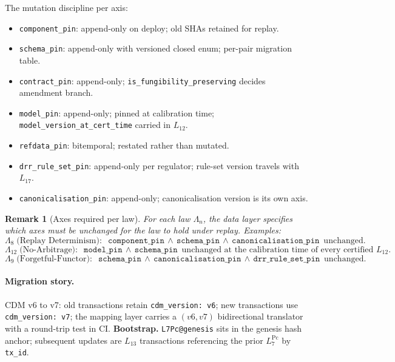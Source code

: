 \documentclass[11pt,a4paper]{article}
\newtheorem{remark}[definition]{Remark}
\begin{document}
The mutation discipline per axis:
\begin{itemize}[nosep]
\item \texttt{component\_pin}: append-only on deploy; old SHAs retained for replay.
\item \texttt{schema\_pin}: append-only with versioned closed enum; per-pair migration table.
\item \texttt{contract\_pin}: append-only; \texttt{is\_fungibility\_preserving} decides amendment branch.
\item \texttt{model\_pin}: append-only; pinned at calibration time; \texttt{model\_version\_at\_cert\_time} carried in $L_{12}$.
\item \texttt{refdata\_pin}: bitemporal; restated rather than mutated.
\item \texttt{drr\_rule\_set\_pin}: append-only per regulator; rule-set version travels with $L_{17}$.
\item \texttt{canonicalisation\_pin}: append-only; canonicalisation version is its own axis.
\end{itemize}

\begin{remark}[Axes required per law]
\label{rem:axes-per-law}
For each law $\Lambda_n$, the data layer specifies which axes must be unchanged for the law to hold under replay. Examples:
\[
\Lambda_8 \;\text{(Replay Determinism)}: \;\;
\texttt{component\_pin} \,\wedge\, \texttt{schema\_pin} \,\wedge\, \texttt{canonicalisation\_pin} \,\text{ unchanged.}
\]
\[
\Lambda_{12} \;\text{(No-Arbitrage)}: \;\;
\texttt{model\_pin} \,\wedge\, \texttt{schema\_pin} \,\text{ unchanged at the calibration time of every certified } L_{12}.
\]
\[
\Lambda_9 \;\text{(Forgetful-Functor)}: \;\;
\texttt{schema\_pin} \,\wedge\, \texttt{canonicalisation\_pin} \,\wedge\, \texttt{drr\_rule\_set\_pin} \,\text{ unchanged.}
\]
\end{remark}

\paragraph{Migration story.} CDM v6 to v7: old transactions retain \texttt{cdm\_version: v6}; new transactions use \texttt{cdm\_version: v7}; the mapping layer carries a $(v6, v7)$ bidirectional translator with a round-trip test in CI. \textbf{Bootstrap.} \texttt{L7Pc@genesis} sits in the genesis hash anchor; subsequent updates are $L_{13}$ transactions referencing the prior $L_7^{\mathrm{Pc}}$ by \texttt{tx\_id}.
\end{document}
